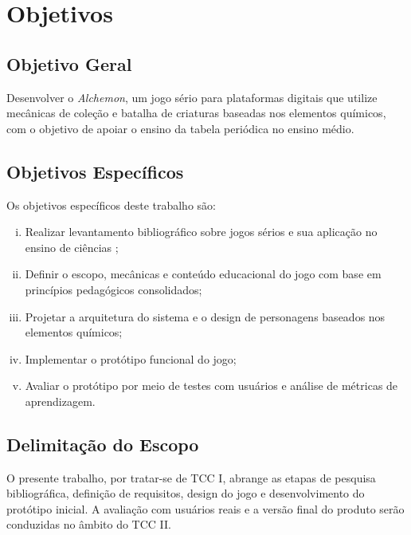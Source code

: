
\section{Objetivos}

\subsection{Objetivo Geral}

Desenvolver o \textit{Alchemon}, um jogo sério para plataformas digitais que
utilize mecânicas de coleção e batalha de criaturas baseadas nos elementos
químicos, com o objetivo de apoiar o ensino da tabela periódica no ensino médio.

\subsection{Objetivos Específicos}

Os objetivos específicos deste trabalho são:

\begin{enumerate}[i.]
    \item Realizar levantamento bibliográfico sobre jogos sérios e sua aplicação
          no ensino de ciências \cite{prensky2001digital};
    \item Definir o escopo, mecânicas e conteúdo educacional do jogo com base
          em princípios pedagógicos consolidados;
    \item Projetar a arquitetura do sistema e o design de personagens baseados
          nos elementos químicos;
    \item Implementar o protótipo funcional do jogo;
    \item Avaliar o protótipo por meio de testes com usuários e análise de
          métricas de aprendizagem.
\end{enumerate}


\subsection{Delimitação do Escopo}

O presente trabalho, por tratar-se de TCC I, abrange as etapas de pesquisa
bibliográfica, definição de requisitos, design do jogo e desenvolvimento do
protótipo inicial. A avaliação com usuários reais e a versão final do produto
serão conduzidas no âmbito do TCC II.


